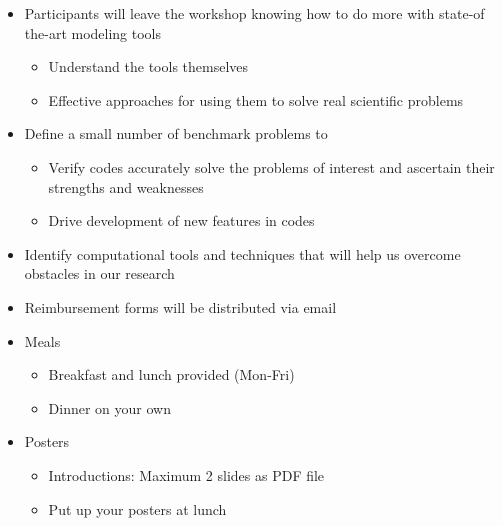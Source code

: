 \documentclass[pdftex,cig,slideColor]{pp4slides}
\begin{document}
  \begin{itemize}
  \item Participants will leave the workshop knowing how to do more
    with state-of the-art modeling tools
    \begin{itemize}
    \item Understand the tools themselves
    \item Effective approaches for using them to solve real scientific problems
    \end{itemize}
  \item Define a small number of benchmark problems to 
    \begin{itemize}
    \item Verify codes accurately solve the problems of interest and
      ascertain their strengths and weaknesses
    \item Drive development of new features in codes
    \end{itemize}
  \item Identify computational tools and techniques that will help us
    overcome obstacles in our research
  \end{itemize}
  
  \summary{}

  \begin{itemize}
  \item Reimbursement forms will be distributed via email
  \item Meals
    \begin{itemize}
    \item Breakfast and lunch provided (Mon-Fri)
    \item Dinner on your own
    \end{itemize}
 \item Posters
    \begin{itemize}
    \item Introductions: Maximum 2 slides as PDF file
    \item Put up your posters at lunch
    \end{itemize}
  \end{itemize}

\end{document}
